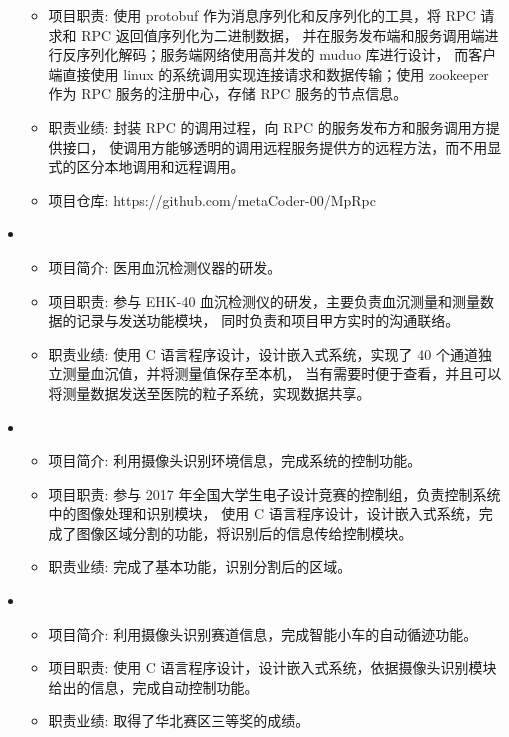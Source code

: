 \begin{itemize}[leftmargin=*]
{\begin{itemize}
      \item 项目职责: 使用 protobuf 作为消息序列化和反序列化的工具，将 RPC 请求和 RPC 返回值序列化为二进制数据，
      并在服务发布端和服务调用端进行反序列化解码；服务端网络使用高并发的 muduo 库进行设计，
      而客户端直接使用 linux 的系统调用实现连接请求和数据传输；使用 zookeeper 作为 RPC 服务的注册中心，存储 RPC 服务的节点信息。
      \item 职责业绩: 封装 RPC 的调用过程，向 RPC 的服务发布方和服务调用方提供接口，
      使调用方能够透明的调用远程服务提供方的远程方法，而不用显式的区分本地调用和远程调用。
      \item 项目仓库: https://github.com/metaCoder-00/MpRpc
    \end{itemize}
    }
    \item
    {\small
    \begin{itemize}
      \item 项目简介: 医用血沉检测仪器的研发。
      \item 项目职责: 参与 EHK-40 血沉检测仪的研发，主要负责血沉测量和测量数据的记录与发送功能模块，
      同时负责和项目甲方实时的沟通联络。
      \item 职责业绩: 使用 C 语言程序设计，设计嵌入式系统，实现了 40 个通道独立测量血沉值，并将测量值保存至本机，
      当有需要时便于查看，并且可以将测量数据发送至医院的粒子系统，实现数据共享。
    \end{itemize}
    }
    \item
    {\small
    \begin{itemize}
      \item 项目简介: 利用摄像头识别环境信息，完成系统的控制功能。
      \item 项目职责: 参与 2017 年全国大学生电子设计竞赛的控制组，负责控制系统中的图像处理和识别模块，
      使用 C 语言程序设计，设计嵌入式系统，完成了图像区域分割的功能，将识别后的信息传给控制模块。
      \item 职责业绩: 完成了基本功能，识别分割后的区域。
    \end{itemize}
    }
    \item
    {\small
    \begin{itemize}
      \item 项目简介: 利用摄像头识别赛道信息，完成智能小车的自动循迹功能。
      \item 项目职责: 使用 C 语言程序设计，设计嵌入式系统，依据摄像头识别模块给出的信息，完成自动控制功能。
      \item 职责业绩: 取得了华北赛区三等奖的成绩。
    \end{itemize}
    }
  \end{itemize}